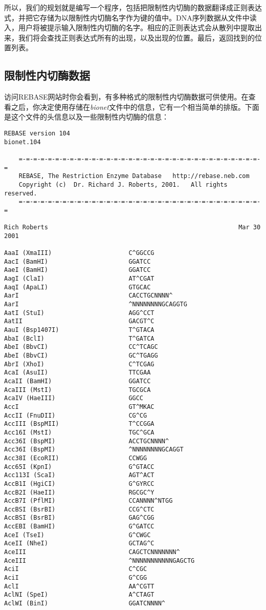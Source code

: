 所以，我们的规划就是编写一个程序，包括把限制性内切酶的数据翻译成正则表达式，并把它存储为以限制性内切酶名字作为键的值中。DNA序列数据从文件中读入，用户将被提示输入限制性内切酶的名字。相应的正则表达式会从散列中提取出来，我们将会查找正则表达式所有的出现，以及出现的位置。最后，返回找到的位置列表。

\subsection{限制性内切酶数据}
访问REBASE网站时你会看到，有多种格式的限制性内切酶数据可供使用。在查看之后，你决定使用存储在\textit{bionet}文件中的信息，它有一个相当简单的排版。下面是这个文件的头信息以及一些限制性内切酶的信息：

\begin{lstlisting}
REBASE version 104                                              bionet.104
 
    =-=-=-=-=-=-=-=-=-=-=-=-=-=-=-=-=-=-=-=-=-=-=-=-=-=-=-=-=-=-=-=-=-=
    REBASE, The Restriction Enzyme Database   http://rebase.neb.com
    Copyright (c)  Dr. Richard J. Roberts, 2001.   All rights reserved.
    =-=-=-=-=-=-=-=-=-=-=-=-=-=-=-=-=-=-=-=-=-=-=-=-=-=-=-=-=-=-=-=-=-=
 
Rich Roberts                                                    Mar 30 2001
 
AaaI (XmaIII)                     C^GGCCG
AacI (BamHI)                      GGATCC
AaeI (BamHI)                      GGATCC
AagI (ClaI)                       AT^CGAT
AaqI (ApaLI)                      GTGCAC
AarI                              CACCTGCNNNN^
AarI                              ^NNNNNNNNGCAGGTG
AatI (StuI)                       AGG^CCT
AatII                             GACGT^C
AauI (Bsp1407I)                   T^GTACA
AbaI (BclI)                       T^GATCA
AbeI (BbvCI)                      CC^TCAGC
AbeI (BbvCI)                      GC^TGAGG
AbrI (XhoI)                       C^TCGAG
AcaI (AsuII)                      TTCGAA
AcaII (BamHI)                     GGATCC
AcaIII (MstI)                     TGCGCA
AcaIV (HaeIII)                    GGCC
AccI                              GT^MKAC
AccII (FnuDII)                    CG^CG
AccIII (BspMII)                   T^CCGGA
Acc16I (MstI)                     TGC^GCA
Acc36I (BspMI)                    ACCTGCNNNN^
Acc36I (BspMI)                    ^NNNNNNNNGCAGGT
Acc38I (EcoRII)                   CCWGG
Acc65I (KpnI)                     G^GTACC
Acc113I (ScaI)                    AGT^ACT
AccB1I (HgiCI)                    G^GYRCC
AccB2I (HaeII)                    RGCGC^Y
AccB7I (PflMI)                    CCANNNN^NTGG
AccBSI (BsrBI)                    CCG^CTC
AccBSI (BsrBI)                    GAG^CGG
AccEBI (BamHI)                    G^GATCC
AceI (TseI)                       G^CWGC
AceII (NheI)                      GCTAG^C
AceIII                            CAGCTCNNNNNNN^
AceIII                            ^NNNNNNNNNNNGAGCTG
AciI                              C^CGC
AciI                              G^CGG
AclI                              AA^CGTT
AclNI (SpeI)                      A^CTAGT
AclWI (BinI)                      GGATCNNNN^
\end{lstlisting}

